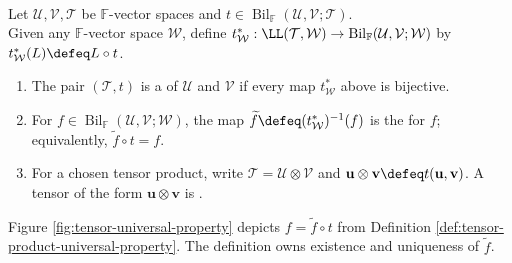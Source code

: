 \begin{definition} \label{def:tensor-product-universal-property} \\
Let $\mathcal{U},\mathcal{V},\mathcal{T}$ be $\mathbb{F}$-vector spaces and $t\in\operatorname{Bil}_{\mathbb{F}}(\mathcal{U},\mathcal{V};\mathcal{T})$.\\
Given any $\mathbb{F}$-vector space $\mathcal{W}$, define $t_{\mathcal{W}}^\ast:\LL(\mathcal{T},\mathcal{W})\to\operatorname{Bil}_{\mathbb{F}}(\mathcal{U},\mathcal{V};\mathcal{W})$ by $t_{\mathcal{W}}^\ast(L)\defeq L\circ t$.
\begin{enumerate}[label=(\roman*)]
\setlength{\itemsep}{0pt}
\item The pair $(\mathcal{T},t)$ is a  of $\mathcal{U}$ and $\mathcal{V}$ if every map $t_{\mathcal{W}}^\ast$ above is bijective.
\item For $f\in\operatorname{Bil}_{\mathbb{F}}(\mathcal{U},\mathcal{V};\mathcal{W})$, the map $\widetilde{f}\defeq(t_{\mathcal{W}}^\ast)^{-1}(f)$ is the  for $f$; equivalently, $\widetilde{f}\circ t=f$.
\item For a chosen tensor product, write $\mathcal{T}=\mathcal{U}\otimes\mathcal{V}$ and $\mathbf{u}\otimes\mathbf{v}\defeq t(\mathbf{u},\mathbf{v})$. A tensor of the form $\mathbf{u}\otimes\mathbf{v}$ is .
\end{enumerate}
\end{definition}

\begin{illustrationfigure}[H]
  \centering
  
  \caption{A tensor product is universal for bilinear maps out of $\mathcal{U}\times\mathcal{V}$.}
  \label{fig:tensor-universal-property}
\end{illustrationfigure}

Figure \ref{fig:tensor-universal-property} depicts $f=\widetilde{f}\circ t$ from Definition \ref{def:tensor-product-universal-property}. The definition owns existence and uniqueness of $\widetilde{f}$.


